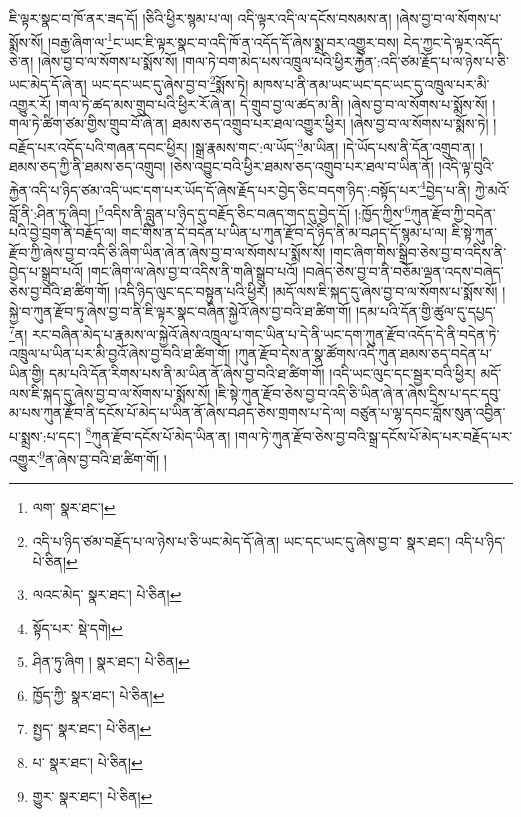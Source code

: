 ཇི་ལྟར་སྣང་བ་ཁོ་ནར་ཟད་དོ། །ཅིའི་ཕྱིར་སྙམ་པ་ལ། འདི་ལྟར་འདི་ལ་དངོས་བསམས་ན། །ཞེས་བྱ་བ་ལ་སོགས་པ་སྨོས་སོ། །བརྒྱ་ཞིག་ལ་\footnote{ལག་  སྣར་ཐང་། }ང་ཡང་ཇི་ལྟར་སྣང་བ་འདི་ཁོ་ན་འདོད་དོ་ཞེས་སྨྲ་བར་འགྱུར་བས། ངེད་ཀྱང་དེ་ལྟར་འདོད་ཅེ་ན། །ཞེས་བྱ་བ་ལ་སོགས་པ་སྨོས་སོ། །གལ་ཏེ་བག་མེད་པས་འཁྲུལ་པའི་ཕྱིར་རྐྱེན་:འདི་ཙམ་རྗོད་པ་ལ་ཉེས་པ་ཅི་ཡང་མེད་དོ་ཞེ་ན། ཡང་དང་ཡང་དུ་ཞེས་བྱ་བ་\footnote{འདི་པ་ཉིད་ཙམ་བརྗོད་པ་ལ་ཉེས་པ་ཅི་ཡང་མེད་དོ་ཞེ་ན། ཡང་དང་ཡང་དུ་ཞེས་བྱ་བ་  སྣར་ཐང་། འདི་པ་ཉིད་  པེ་ཅིན། }སྨོས་ཏེ། མཁས་པ་ནི་ནམ་ཡང་ཡང་དང་ཡང་དུ་འཁྲུལ་པར་མི་འགྱུར་རོ། །གལ་ཏེ་ཚད་མས་གྲུབ་པའི་ཕྱིར་རོ་ཞེ་ན། དེ་གྲུབ་བྱ་ལ་ཚད་མ་ནི། །ཞེས་བྱ་བ་ལ་སོགས་པ་སྨོས་སོ། །གལ་ཏེ་ཚིག་ཙམ་གྱིས་གྲུབ་བོ་ཞེ་ན། ཐམས་ཅད་འགྲུབ་པར་ཐལ་འགྱུར་ཕྱིར། །ཞེས་བྱ་བ་ལ་སོགས་པ་སྨོས་ཏེ། །བརྗོད་པར་འདོད་པའི་གཞན་དབང་ཕྱིར། །སྒྲ་རྣམས་གང་:ལ་ཡོད་\footnote{ལའང་མེད་  སྣར་ཐང་།  པེ་ཅིན། }མ་ཡིན། །དེ་ཡོད་པས་ནི་དོན་འགྲུབ་ན། །ཐམས་ཅད་ཀྱི་ནི་ཐམས་ཅད་འགྲུབ། །ཅེས་འབྱུང་བའི་ཕྱིར་ཐམས་ཅད་འགྲུབ་པར་ཐལ་བ་ཡིན་ནོ། །འདི་ལྟ་བུའི་རྐྱེན་འདི་པ་ཉིད་ཙམ་འདི་ཡང་དག་པར་ཡོད་དོ་ཞེས་རྗོད་པར་བྱེད་ཅིང་བདག་ཉིད་:བསྟོད་པར་\footnote{སྟོད་པར་  སྡེ་དགེ། }བྱེད་པ་ནི། ཀྱེ་མའོ་བློ་ནི་:ཤིན་ཏུ་ཞིབ། །\footnote{ཤིན་ཏུ་ཞིག །  སྣར་ཐང་།  པེ་ཅིན། }འདིས་ནི་བླུན་པ་ཉིད་དུ་བརྗོད་ཅིང་བཞད་གད་དུ་བྱེད་དོ། །:ཁྱོད་ཀྱིས་\footnote{ཁྱོད་ཀྱི་  སྣར་ཐང་།  པེ་ཅིན། }ཀུན་རྫོབ་ཀྱི་བདེན་པའི་བྱེ་བྲག་ནི་བརྗོད་ལ། གང་གིས་ན་དེ་བདེན་པ་ཡིན་པ་ཀུན་རྫོབ་དེ་ཉིད་ནི་མ་བཤད་དོ་སྙམ་པ་ལ། ཇི་སྟེ་ཀུན་རྫོབ་ཀྱི་ཞེས་བྱ་བ་འདི་ཅི་ཞིག་ཡིན་ཞེ་ན་ཞེས་བྱ་བ་ལ་སོགས་པ་སྨོས་སོ། །གང་ཞིག་གིས་སྒྲིབ་ཅེས་བྱ་བ་འདིས་ནི་བྱེད་པ་སྒྲུབ་པའོ། །གང་ཞིག་ལ་ཞེས་བྱ་བ་འདིས་ནི་གཞི་སྒྲུབ་པའོ། །བཞེད་ཅེས་བྱ་བ་ནི་བཅོམ་ལྡན་འདས་བཞེད་ཅེས་བྱ་བའི་ཐ་ཚིག་གོ། །འདི་ཉིད་ལུང་དང་བསྟུན་པའི་ཕྱིར། །མདོ་ལས་ཇི་སྐད་དུ་ཞེས་བྱ་བ་ལ་སོགས་པ་སྨོས་སོ། །སྐྱེ་བ་ཀུན་རྫོབ་ཏུ་ཞེས་བྱ་བ་ནི་ཇི་ལྟར་སྣང་བཞིན་སྐྱེའོ་ཞེས་བྱ་བའི་ཐ་ཚིག་གོ། །དམ་པའི་དོན་གྱི་ཚུལ་དུ་དཔྱད་\footnote{སྤྱད་  སྣར་ཐང་།  པེ་ཅིན། }ན། རང་བཞིན་མེད་པ་རྣམས་ལ་སྐྱེའོ་ཞེས་འཁྲུལ་པ་གང་ཡིན་པ་དེ་ནི་ཡང་དག་ཀུན་རྫོབ་འདོད་དེ་ནི་བདེན་ཏེ་འཁྲུལ་པ་ཡིན་པར་མི་བྱའོ་ཞེས་བྱ་བའི་ཐ་ཚིག་གོ། །ཀུན་རྫོབ་དེས་ན་སྣ་ཚོགས་འདི་ཀུན་ཐམས་ཅད་བདེན་པ་ཡིན་གྱི། དམ་པའི་དོན་རིགས་པས་ནི་མ་ཡིན་ནོ་ཞེས་བྱ་བའི་ཐ་ཚིག་གོ། །འདི་ཡང་ལུང་དང་སྦྱར་བའི་ཕྱིར། མདོ་ལས་ཇི་སྐད་དུ་ཞེས་བྱ་བ་ལ་སོགས་པ་སྨོས་སོ། །ཇི་སྟེ་ཀུན་རྫོབ་ཅེས་བྱ་བ་འདི་ཅི་ཡིན་ཞེ་ན་ཞེས་དྲིས་པ་དང་དབུ་མ་པས་ཀུན་རྫོབ་ནི་དངོས་པོ་མེད་པ་ཡིན་ནོ་ཞེས་བཤད་ཅེས་གྲགས་པ་དེ་ལ། བཙུན་པ་ལྷ་དབང་བློས་སུན་འབྱིན་པ་སྨྲས་:པ་དང་། \footnote{པ་  སྣར་ཐང་།  པེ་ཅིན། }ཀུན་རྫོབ་དངོས་པོ་མེད་ཡིན་ན། །གལ་ཏེ་ཀུན་རྫོབ་ཅེས་བྱ་བའི་སྒྲ་དངོས་པོ་མེད་པར་བརྗོད་པར་འགྱུར་\footnote{གྱུར་  སྣར་ཐང་།  པེ་ཅིན། }ན་ཞེས་བྱ་བའི་ཐ་ཚིག་གོ། །
